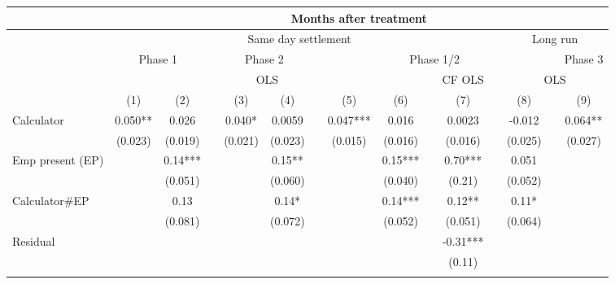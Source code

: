 \begin{tabular}{lcccccccccccccc}
\toprule
      & \multicolumn{14}{c}{Months after treatment} \\
\midrule
\midrule
      & \multicolumn{10}{c}{Same day settlement}                                      &       & \multicolumn{3}{c}{Long run} \\
\cmidrule{2-11}\cmidrule{13-15}      & \multicolumn{2}{c}{Phase 1} &       & \multicolumn{2}{c}{Phase 2} &       & \multicolumn{6}{c}{Phase 1/2}                 &       & Phase 3 \\
\cmidrule{2-3}\cmidrule{5-6}\cmidrule{8-13}\cmidrule{15-15}      & \multicolumn{8}{c}{OLS}                                       &       & CF OLS &       & \multicolumn{3}{c}{OLS} \\
\cmidrule{2-9}\cmidrule{11-11}\cmidrule{13-15}      & (1)   & (2)   &       & (3)   & (4)   &       & (5)   & (6)   &       & (7)   &       & (8)   &       & (9) \\
\cmidrule{1-13}\cmidrule{15-15}Calculator  & 0.050** & 0.026 &       & 0.040* & 0.0059 &       & 0.047*** & 0.016 &       & 0.0023 &       & -0.012 &       & 0.064** \\
      & (0.023) & (0.019) &       & (0.021) & (0.023) &       & (0.015) & (0.016) &       & (0.016) &       & (0.025) &       & (0.027) \\
Emp present (EP) &       & 0.14*** &       &       & 0.15** &       &       & 0.15*** &       & 0.70*** &       & 0.051 &       &  \\
      &       & (0.051) &       &       & (0.060) &       &       & (0.040) &       & (0.21) &       & (0.052) &       &  \\
Calculator\#EP &       & 0.13  &       &       & 0.14* &       &       & 0.14*** &       & 0.12** &       & 0.11* &       &  \\
      &       & (0.081) &       &       & (0.072) &       &       & (0.052) &       & (0.051) &       & (0.064) &       &  \\
Residual &       &       &       &       &       &       &       &       &       & -0.31*** &       &       &       &  \\
      &       &       &       &       &       &       &       &       &       & (0.11) &       &       &       &  \\
      &       &       &       &       &       &       &       &       &       &       &       &       &       &  \\

\end{tabular}
